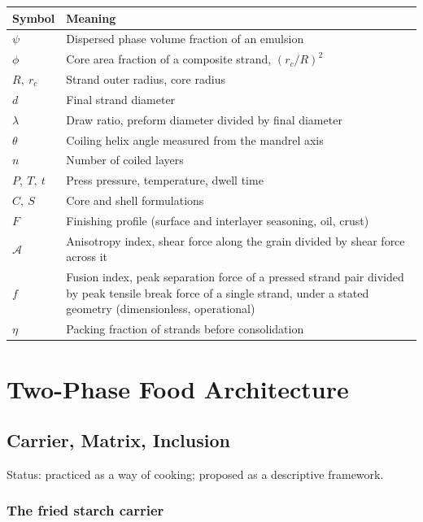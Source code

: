 \documentclass[11pt,openany]{book}
\theoremstyle{definition}
\begin{document}
\begin{tabularx}{\linewidth}{@{}lX@{}}
\toprule
Symbol & Meaning \\
\midrule
$\psi$ & Dispersed phase volume fraction of an emulsion \\
$\phi$ & Core area fraction of a composite strand, $(r_c/R)^2$ \\
$R,\ r_c$ & Strand outer radius, core radius \\
$d$ & Final strand diameter \\
$\lambda$ & Draw ratio, preform diameter divided by final diameter \\
$\theta$ & Coiling helix angle measured from the mandrel axis \\
$n$ & Number of coiled layers \\
$P,\ T,\ t$ & Press pressure, temperature, dwell time \\
$C,\ S$ & Core and shell formulations \\
$F$ & Finishing profile (surface and interlayer seasoning, oil, crust) \\
$\mathcal{A}$ & Anisotropy index, shear force along the grain divided by shear force across it \\
$f$ & Fusion index, peak separation force of a pressed strand pair divided by peak tensile break force of a single strand, under a stated geometry (dimensionless, operational) \\
$\eta$ & Packing fraction of strands before consolidation \\
\bottomrule
\end{tabularx}

\tableofcontents

\mainmatter

\part{Two-Phase Food Architecture}

\chapter{Carrier, Matrix, Inclusion}\label{ch:carrier}

Status: practiced as a way of cooking; proposed as a descriptive framework.

\section{The fried starch carrier}
\end{document}

